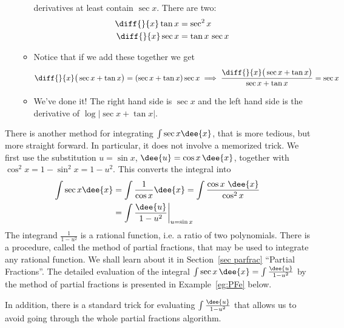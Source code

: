 \begin{eg}
\begin{itemize}
\begin{itemize}
              derivatives at least contain $\sec x$. There are two:
   \begin{align*}
      \diff{}{x}\tan x &= \sec^2 x \\
      \diff{}{x}\sec x &= \tan x\,\sec x
   \end{align*}
   \item Notice that if we add these together we get
       \begin{align*}
       \diff{}{x}\big(\sec x+\tan x\big) =(\sec x+\tan x)\sec x
       \implies \frac{\diff{}{x}\big(\sec x+\tan x\big)}{\sec x+\tan x}=\sec x
       \end{align*}
  \item We've done it! The right hand side is $\sec x$ and the left hand side
        is the derivative of $\log|\sec x+\tan x|$.
\end{itemize}

\end{itemize}
\end{eg}
There is another method for integrating $\int \sec x\dee{x}$, that is
more tedious, but more straight forward. In particular, it does not involve 
a memorized trick. We first use the substitution $u=\sin x$, 
$\dee{u}=\cos x\,\dee{x}$, together with $\cos^2 x = 1-\sin^2x=1-u^2$. 
This converts the integral into
\begin{align*}
\int \sec x\dee{x}
  &= \int\frac{1}{\cos x}\dee{x} 
  = \int\frac{\cos x\ \dee{x}}{\cos^2 x} \\
  &= \int \frac{\dee{u}}{1-u^2}\bigg|_{u=\sin x}
\end{align*}
The integrand $\frac{1}{1-u^2}$ is a rational function,
i.e. a ratio of two polynomials. There is a procedure, called  the method of
partial fractions, that may be used to integrate any rational function.
We shall learn about it in Section~\ref{sec parfrac} ``Partial Fractions''. 
The detailed evaluation of the integral $\int \sec x\,\dee{x}
=\int\frac{\dee{u}}{1-u^2}$ by the method of partial fractions is presented 
in Example~\ref{eg:PFe} below.

In addition, there is a standard trick for evaluating $\int\frac{\dee{u}}{1-u^2}$ that allows us to avoid going through the whole partial fractions algorithm.

